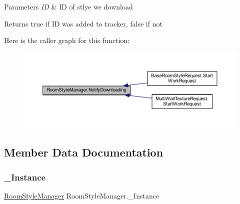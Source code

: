 \begin{DoxyParams}{Parameters}
{\em ID} & ID of stlye we download\\
\hline
\end{DoxyParams}
\begin{DoxyReturn}{Returns}
true if ID was added to tracker, false if not
\end{DoxyReturn}
Here is the caller graph for this function\+:
\nopagebreak
\begin{figure}[H]
\begin{center}
\leavevmode
\includegraphics[width=350pt]{class_room_style_manager_a3d3f5a2cb6e861577d01b015c30c3d9a_icgraph}
\end{center}
\end{figure}


\subsection{Member Data Documentation}
\mbox{\label{class_room_style_manager_a1f3eb1f4b0e619fa59fc1584ef21a6c3}} 
\subsubsection{\texorpdfstring{\+\_\+\+Instance}{\_Instance}}
{\footnotesize\ttfamily \mbox{\hyperlink{class_room_style_manager}{Room\+Style\+Manager}} Room\+Style\+Manager.\+\_\+\+Instance\hspace{0.3cm}{\ttfamily [static]}}

\mbox{\label{class_room_style_manager_ae508b55c7621b0c69424050942d436d6}} 
